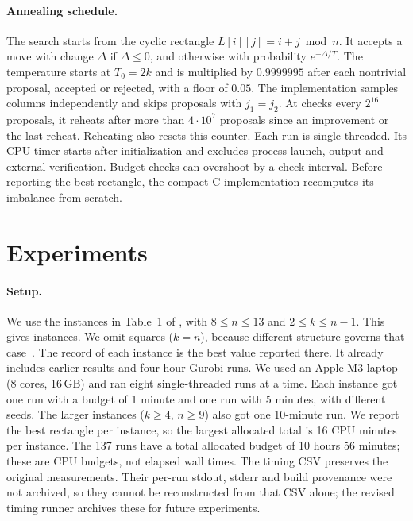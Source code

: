 \documentclass[11pt]{article}
\begin{document}
\paragraph{Annealing schedule.} The search starts from the cyclic rectangle
$L[i][j]=i+j \bmod n$. It accepts a move with change $\Delta$ if $\Delta\le 0$, and otherwise
with probability $e^{-\Delta/T}$. The temperature starts at $T_0=2k$ and is multiplied by
$0.9999995$ after each nontrivial proposal, accepted or rejected, with a floor of $0.05$.
The implementation samples columns independently and skips proposals with $j_1=j_2$.
At checks every $2^{16}$ proposals, it reheats after more than $4\cdot10^7$ proposals
since an improvement or the last reheat. Reheating also resets this counter.
Each run is single-threaded. Its CPU timer starts after initialization and excludes
process launch, output and external verification. Budget checks can overshoot by a
check interval. Before reporting the best rectangle, the compact C implementation
recomputes its imbalance from scratch.

\section{Experiments}

\paragraph{Setup.} We use the instances in Table~1 of \citet{VoborilRamaswamySzeider2025}, with
$8\le n\le 13$ and $2\le k\le n-1$. This gives \NumCells{} instances. We omit squares ($k=n$),
because different structure governs that case~\citep{XiaEtAl2026}. The record of each instance is
the best value reported there. It already includes earlier results and four-hour Gurobi runs. We
used an Apple M3 laptop (8 cores, 16\,GB) and ran eight single-threaded runs at a time. Each
instance got one run with a budget of 1 minute and one run with 5 minutes, with different seeds.
The larger instances ($k\ge4$, $n\ge9$) also got one 10-minute run. We report the best rectangle
per instance, so the largest allocated total is 16 CPU minutes per instance. The 137 runs
have a total allocated budget of 10 hours 56 minutes; these are CPU budgets, not elapsed
wall times. The timing CSV preserves the original measurements. Their per-run stdout,
stderr and build provenance were not archived, so they cannot be reconstructed from
that CSV alone; the revised timing runner archives these for future experiments.
\end{document}
